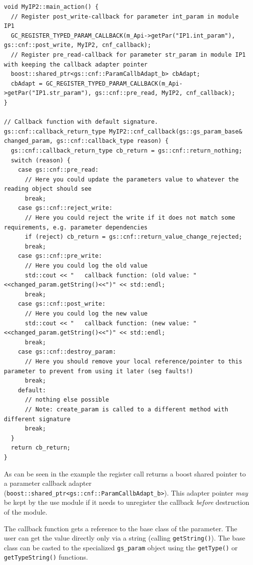 \begin{lstlisting}
void MyIP2::main_action() {
  // Register post_write-callback for parameter int_param in module IP1
  GC_REGISTER_TYPED_PARAM_CALLBACK(m_Api->getPar("IP1.int_param"), gs::cnf::post_write, MyIP2, cnf_callback);
  // Register pre_read-callback for parameter str_param in module IP1 with keeping the callback adapter pointer
  boost::shared_ptr<gs::cnf::ParamCallbAdapt_b> cbAdapt;
  cbAdapt = GC_REGISTER_TYPED_PARAM_CALLBACK(m_Api->getPar("IP1.str_param"), gs::cnf::pre_read, MyIP2, cnf_callback);
}

// Callback function with default signature.
gs::cnf::callback_return_type MyIP2::cnf_callback(gs::gs_param_base& changed_param, gs::cnf::callback_type reason) {
  gs::cnf::callback_return_type cb_return = gs::cnf::return_nothing;
  switch (reason) {
    case gs::cnf::pre_read:
      // Here you could update the parameters value to whatever the reading object should see
      break;
    case gs::cnf::reject_write:
      // Here you could reject the write if it does not match some requirements, e.g. parameter dependencies
      if (reject) cb_return = gs::cnf::return_value_change_rejected;
      break;
    case gs::cnf::pre_write:
      // Here you could log the old value
      std::cout << "   callback function: (old value: "<<changed_param.getString()<<")" << std::endl;
      break;
    case gs::cnf::post_write:
      // Here you could log the new value
      std::cout << "   callback function: (new value: "<<changed_param.getString()<<")" << std::endl;
      break;
    case gs::cnf::destroy_param:
      // Here you should remove your local reference/pointer to this parameter to prevent from using it later (seg faults!)
      break;
    default:
      // nothing else possible
      // Note: create_param is called to a different method with different signature
      break;
  }
  return cb_return;
}
\end{lstlisting}

As can be seen in the example the register call returns a boost shared pointer to a parameter callback adapter (\lstinline|boost::shared_ptr<gs::cnf::ParamCallbAdapt_b>|). This adapter pointer {\em may} be kept by the use module if it needs to unregister the callback {\em before} destruction of the module.

The callback function gets a reference to the base class of the parameter. The user can get the value directly only via a string (calling \lstinline|getString()|). The base class can be casted to the specialized \lstinline|gs_param| object using the \lstinline|getType()| or \lstinline|getTypeString()| functions.

